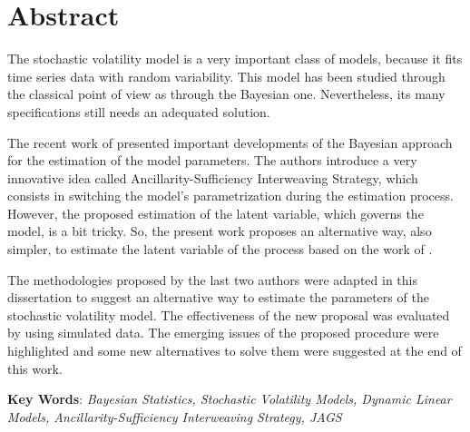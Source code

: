 \chapter*{Abstract}

The stochastic volatility model \citep{kim} is a very important class of models, because it fits time series data with random variability. This model has been studied through the classical point of view as through the Bayesian one. Nevertheless, its many specifications still needs an adequated solution.

The recent work of \cite{kastner} presented important developments of the Bayesian approach for the estimation of the model parameters. The authors introduce a very innovative idea called Ancillarity-Sufficiency Interweaving Strategy, which consists in switching the model's parametrization during the estimation process. However, the proposed estimation of the latent variable, which governs the model, is a bit tricky. So, the present work proposes an alternative way, also simpler, to estimate the latent variable of the process based on the work of \cite{mccormick}.

The methodologies proposed by the last two authors were adapted in this dissertation to suggest an alternative way to estimate the parameters of the stochastic volatility model. The effectiveness of the new proposal was evaluated by using simulated data. The emerging issues of the proposed procedure were highlighted and some new alternatives to solve them were suggested at the end of this work.
\newline

\noindent \textbf{Key Words}: \textit{Bayesian Statistics, Stochastic Volatility Models, Dynamic Linear Models, Ancillarity-Sufficiency Interweaving Strategy, JAGS}
